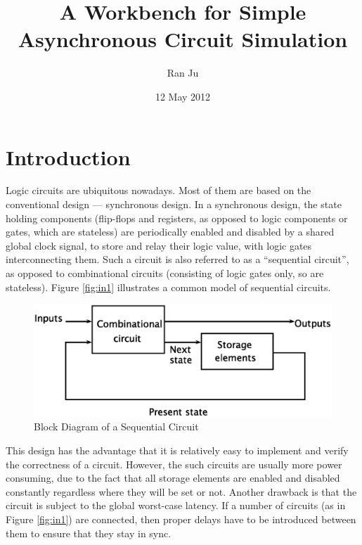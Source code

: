 \documentclass[a4paper,10pt]{article}
\title{A Workbench for Simple Asynchronous Circuit Simulation}
\author{Ran Ju}
\date{12 May 2012}
\begin{document}
\maketitle

\begin{abstract}

\end{abstract}
\tableofcontents
\section{Introduction}
Logic circuits are ubiquitous nowadays.  Most of them are based on the conventional design --- synchronous design\cite[Page 3]{bible}.  In a synchronous design, the state holding components (flip-flops and registers, as opposed to logic components or gates, which are stateless) are periodically enabled and disabled by a shared global clock signal, to store and relay their logic value, with logic gates interconnecting them.  Such a circuit is also referred to as a ``sequential circuit'', as opposed to combinational circuits (consisting of logic gates only, so are stateless).  Figure \ref{fig:in1} illustrates a common model of sequential circuits.

\begin{figure}[H] \label{fig:in1}
\centering
\includegraphics[scale=.5]{combination_circuit.eps}
\caption{Block Diagram of a Sequential Circuit\cite[Page 226]{basic}}\label{fig:in2}
\end{figure}

This design has the advantage that it is relatively easy to implement and verify the correctness of a circuit.  However, the such circuits are usually more power consuming, due to the fact that all storage elements are enabled and disabled constantly regardless where they will be set or not.  Another drawback is that the circuit is subject to the global worst-case latency.  If a number of circuits (as in Figure \ref{fig:in1}) are connected, then proper delays have to be introduced between them to ensure that they stay in sync.  
\end{document}
